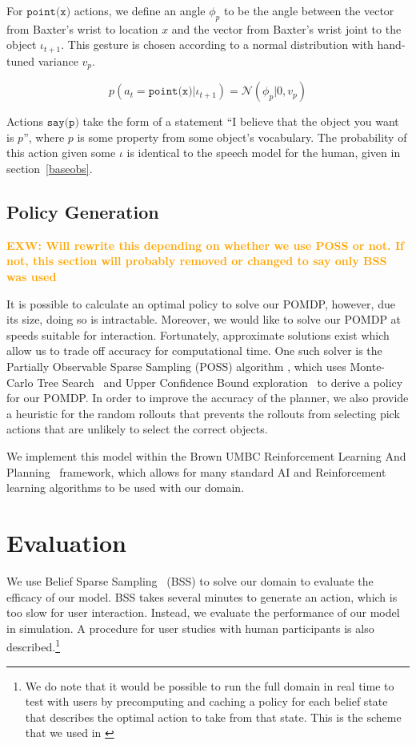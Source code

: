 \documentclass[conference]{IEEEtran}
\newcommand{\exwnote}[1]{\textcolor{orange}{\textbf{EXW: #1}}}
\begin{document}
For $\texttt{point(x)}$ actions, we define an angle $\phi_p$ to be the angle between the vector from Baxter's wrist to location $x$ and the vector from Baxter's wrist joint to the object $\iota_{t+1}$. This gesture is chosen according to a normal distribution with hand-tuned variance $v_p$. 

$$p(a_{t} = \texttt{point(x)} | \iota_{t+1}) = \mathcal{N}(\phi_p | 0, v_{p})$$

Actions $\texttt{say(p)}$ take the form of a statement ``I believe that the object you want is $p$'', where $p$ is some property from some object's vocabulary. The probability of this action given some $\iota$ is identical to the speech model for the human, given in section~\ref{baseobs}. 

\subsection{Policy Generation}

\exwnote{Will rewrite this depending on whether we use POSS or not. If not, this section will probably removed or changed to say only BSS was used}

It is possible to calculate an optimal policy to solve our POMDP, however, due its size, doing so is intractable. Moreover, we would like to solve our POMDP at speeds suitable for interaction. Fortunately, approximate solutions exist which allow us to trade off accuracy for computational time. One such solver is the Partially Observable Sparse Sampling (POSS) algorithm \citep{Gopalan2016}, which uses Monte-Carlo Tree Search~\citep{coulom2006efficient} and Upper Confidence Bound exploration~\citep{kocsis2006bandit} to derive a policy for our POMDP. In order to improve the accuracy of the planner, we also provide a heuristic for the random rollouts that prevents the rollouts from selecting pick actions that are unlikely to select the correct objects. 

We implement this model within the Brown UMBC Reinforcement Learning And Planning~\citep{burlap} framework, which allows for many standard AI and Reinforcement learning algorithms to be used with our domain. 

\section{Evaluation}

We use Belief Sparse Sampling~\citep{bss} (BSS) to solve our domain to evaluate the efficacy of our model. BSS takes several minutes to generate an action, which is too slow for user interaction. Instead, we evaluate the performance of our model in simulation. A procedure for user studies with human participants is also described.\footnote{We do note that it would be possible to run the full domain in real time to test with users by precomputing and caching a policy for each belief state that describes the optimal action to take from that state. This is the scheme that we used in \cite{socialfeedback}}
\end{document}

